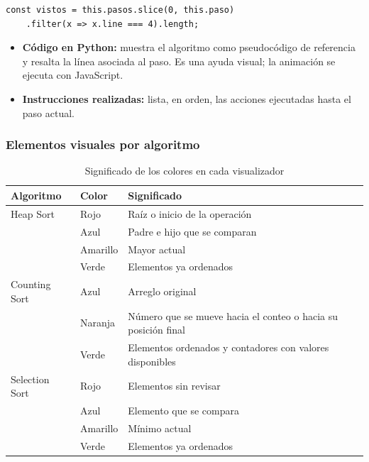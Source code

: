 \documentclass[12pt,a4paper]{article}
\begin{document}
\begin{lstlisting}[caption={Cálculo de un contador en Heap Sort}]
const vistos = this.pasos.slice(0, this.paso)
    .filter(x => x.line === 4).length;
\end{lstlisting}

\begin{itemize}
    \item \textbf{Código en Python:} muestra el algoritmo como pseudocódigo de referencia y resalta la línea asociada al paso. Es una ayuda visual; la animación se ejecuta con JavaScript.
    \item \textbf{Instrucciones realizadas:} lista, en orden, las acciones ejecutadas hasta el paso actual.
\end{itemize}

\subsubsection{Elementos visuales por algoritmo}

\begin{table}[H]
\centering
\caption{Significado de los colores en cada visualizador}
\begin{tabular}{>{\raggedright\arraybackslash}p{2.6cm}>{\raggedright\arraybackslash}p{3.3cm}>{\raggedright\arraybackslash}p{8.2cm}}
\toprule
\textbf{Algoritmo} & \textbf{Color} & \textbf{Significado} \\
\midrule
Heap Sort & Rojo & Raíz o inicio de la operación \\
 & Azul & Padre e hijo que se comparan \\
 & Amarillo & Mayor actual \\
 & Verde & Elementos ya ordenados \\
\midrule
Counting Sort & Azul & Arreglo original \\
 & Naranja & Número que se mueve hacia el conteo o hacia su posición final \\
 & Verde & Elementos ordenados y contadores con valores disponibles \\
\midrule
Selection Sort & Rojo & Elementos sin revisar \\
 & Azul & Elemento que se compara \\
 & Amarillo & Mínimo actual \\
 & Verde & Elementos ya ordenados \\
\bottomrule
\end{tabular}
\end{table}
\end{document}

